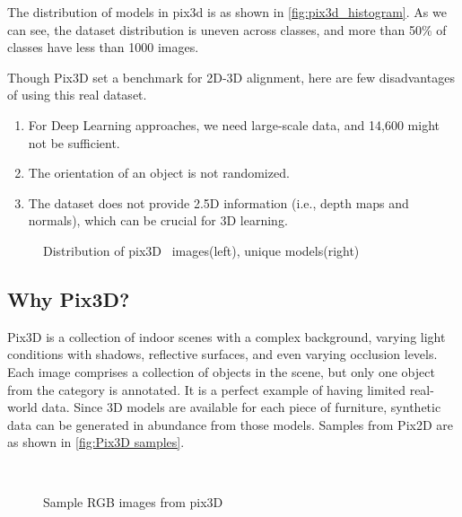 The distribution of models in pix3d is as shown in \autoref{fig:pix3d_histogram}.
As we can see, the dataset distribution is uneven across classes, and more than 50\% of classes have less than 1000 images.

Though Pix3D set a benchmark for 2D-3D alignment, here are few disadvantages of using this real dataset.
\begin{enumerate}
    \item For Deep Learning approaches, we need large-scale data, and 14,600 might not be sufficient.
    \item The orientation of an object is not randomized.
    \item The dataset does not provide 2.5D information (i.e., depth maps and normals), which can be crucial for 3D learning.
\end{enumerate}

\begin{figure}[!ht]
    \resizebox{0.49\textwidth}{6cm}{}
    \resizebox{0.49\textwidth}{6cm}{}
    \caption{Distribution of pix3D~\cite{pix3d} images(left), unique models(right)}
    \label{fig:pix3d_histogram}
\end{figure}

\subsection{Why Pix3D?}\label{subsec:why-pix3d?}
Pix3D is a collection of indoor scenes with a complex background, varying light conditions with shadows, reflective surfaces, and even varying occlusion levels.
Each image comprises a collection of objects in the scene, but only one object from the category is annotated.
It is a perfect example of having limited real-world data.
Since 3D models are available for each piece of furniture, synthetic data can be generated in abundance from those models.
Samples from Pix2D are as shown in \autoref{fig:Pix3D samples}.

\begin{figure}[!ht]
    \centering
    \quad
    \\
    \quad
    \caption{Sample RGB images from pix3D}
    \label{fig:Pix3D samples}
\end{figure}

